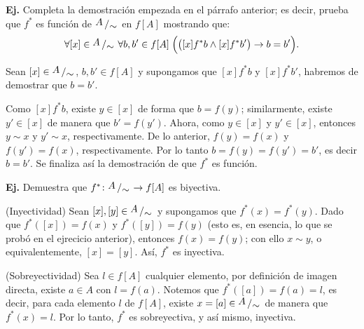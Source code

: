 \documentclass[letterpaper,DIV=14,headsepline,12pt]{scrartcl}
\makeatletter
\newcounter{Ejer}
\newcommand{\pts}{}
\newenvironment{ejercicio}[1]{\noindent
    \ifthenelse{\equal{#1}{1} \OR \equal{#1}{+1}}{\renewcommand{\pts}{\textbf{(#1 pt)}}}{\renewcommand{\pts}{\textbf{(#1 pts)}}}\textbf{Ej. \theEjer} \pts\stepcounter{Ejer}}{\vspace{.3cm}}
\newcommand{\quot}[2]{{\raisebox{.2em}{$#1$}\left/\raisebox{-.2em}{$#2$}\right.}}
\renewenvironment{proof}[1][]{%
        \par\pushQED{\qed}%
        \normalfont\topsep6pt \partopsep0pt %
        \trivlist
        \item[\hskip\labelsep
                \textbf{\textit{Demostración.}}%
        ]#1
        }{%
        \popQED\endtrivlist\@endpefalse
    }
\makeatother
\begin{document}
    \begin{ejercicio}{1.5}\label{ej:fStar} Completa la demostración empezada en
        el párrafo anterior; es decir, prueba que $f^*$ es función de
        $\quot{A}{\sim}$ en $f[A]$ mostrando que:
        \[ \forall [x] \in \quot{A}{\sim} \; \forall b,b' \in f[A] \; \Big( \big(
        [x] f^* b \land [x] f^* b' \big) \to b=b' \Big). \]
    \end{ejercicio}
    \begin{proof}
        Sean $[x] \in \quot{A}{\sim}$, $b,b' \in f[A]$ y supongamos que $[x] f^* b$ y $[x] f^* b'$, habremos de demostrar que $b=b'$.

        Como $[x] f^* b$, existe $y \in [x]$ de forma que $b=f(y)$; similarmente, existe $y' \in [x]$ de manera que $b'=f(y')$. Ahora, como $y \in [x]$ y $y' \in [x]$, entonces $y \sim x$ y $y' \sim x$, respectivamente. De lo anterior, $f(y)=f(x)$ y $f(y')=f(x)$, respectivamente. Por lo tanto $b=f(y)=f(y')=b'$, es decir $b=b'$. Se finaliza así la demostración de que $f^*$ es función.
    \end{proof}

    \begin{ejercicio}{1}
        Demuestra que $f^*\colon \quot{A}{\sim} \to f[A]$ es biyectiva.
    \end{ejercicio}
    \begin{proof}
        (Inyectividad) Sean $[x],[y] \in \quot{A}{\sim}$ y supongamos que $f^*(x)=f^*(y)$. Dado que $f^*([x])=f(x)$ y $f^*([y])=f(y)$ (esto es, en esencia, lo que se probó en el ejrecicio anterior), entonces $f(x)=f(y)$; con ello $x \sim y$, o equivalentemente, $[x]=[y]$. Así, $f^*$ es inyectiva.

        (Sobreyectividad) Sea $l \in f[A]$ cualquier elemento, por definición de imagen directa, existe $a \in A$ con $l=f(a)$. Notemos que $f^*([a])=f(a)=l$, es decir, para cada elemento $l$ de $f[A]$, existe $x=[a] \in \quot{A}{\sim}$ de manera que $f^*(x)=l$. Por lo tanto, $f^*$ es sobreyectiva, y así mismo, inyectiva.
    \end{proof}
\end{document}
